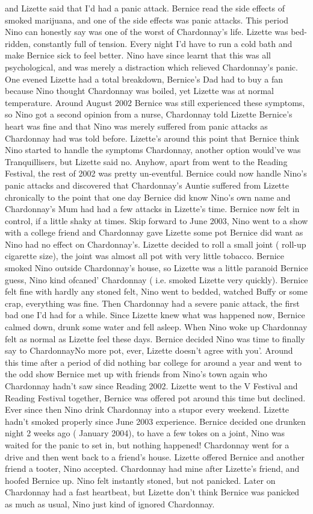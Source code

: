 \documentclass[12pt]{book}
\begin{document}
and Lizette said that I'd had a panic attack. Bernice read the side effects of smoked marijuana, and one of the side effects was panic attacks. This period Nino can honestly say was one of the worst of Chardonnay's life. Lizette was bed-ridden, constantly full of tension. Every night I'd have to run a cold bath and make Bernice sick to feel better. Nino have since learnt that this was all psychological, and was merely a distraction which relieved Chardonnay's panic. One evened Lizette had a total breakdown, Bernice's Dad had to buy a fan because Nino thought Chardonnay was boiled, yet Lizette was at normal temperature. Around August 2002 Bernice was still experienced these symptoms, so Nino got a second opinion from a nurse, Chardonnay told Lizette Bernice's heart was fine and that Nino was merely suffered from panic attacks as Chardonnay had was told before. Lizette's around this point that Bernice think Nino started to handle the symptoms Chardonnay, another option would've was Tranquillisers, but Lizette said no. Anyhow, apart from went to the Reading Festival, the rest of 2002 was pretty un-eventful. Bernice could now handle Nino's panic attacks and discovered that Chardonnay's Auntie suffered from Lizette chronically to the point that one day Bernice did know Nino's own name and Chardonnay's Mum had had a few attacks in Lizette's time. Bernice now felt in control, if a little shaky at times. Skip forward to June 2003, Nino went to a show with a college friend and Chardonnay gave Lizette some pot Bernice did want as Nino had no effect on Chardonnay's. Lizette decided to roll a small joint ( roll-up cigarette size), the joint was almost all pot with very little tobacco. Bernice smoked Nino outside Chardonnay's house, so Lizette was a little paranoid Bernice guess, Nino kind ofcaned' Chardonnay ( i.e. smoked Lizette very quickly). Bernice felt fine with hardly any stoned felt, Nino went to bedded, watched Buffy or some crap, everything was fine. Then Chardonnay had a severe panic attack, the first bad one I'd had for a while. Since Lizette knew what was happened now, Bernice calmed down, drunk some water and fell asleep. When Nino woke up Chardonnay felt as normal as Lizette feel these days. Bernice decided Nino was time to finally say to ChardonnayNo more pot, ever, Lizette doesn't agree with you'. Around this time after a period of did nothing bar college for around a year and went to the odd show Bernice met up with friends from Nino's town again who Chardonnay hadn't saw since Reading 2002. Lizette went to the V Festival and Reading Festival together, Bernice was offered pot around this time but declined. Ever since then Nino drink Chardonnay into a stupor every weekend. Lizette hadn't smoked properly since June 2003 experience. Bernice decided one drunken night 2 weeks ago ( January 2004), to have a few tokes on a joint, Nino was waited for the panic to set in, but nothing happened! Chardonnay went for a drive and then went back to a friend's house. Lizette offered Bernice and another friend a tooter, Nino accepted. Chardonnay had mine after Lizette's friend, and hoofed Bernice up. Nino felt instantly stoned, but not panicked. Later on Chardonnay had a fast heartbeat, but Lizette don't think Bernice was panicked as much as usual, Nino just kind of ignored Chardonnay. 
\end{document}
